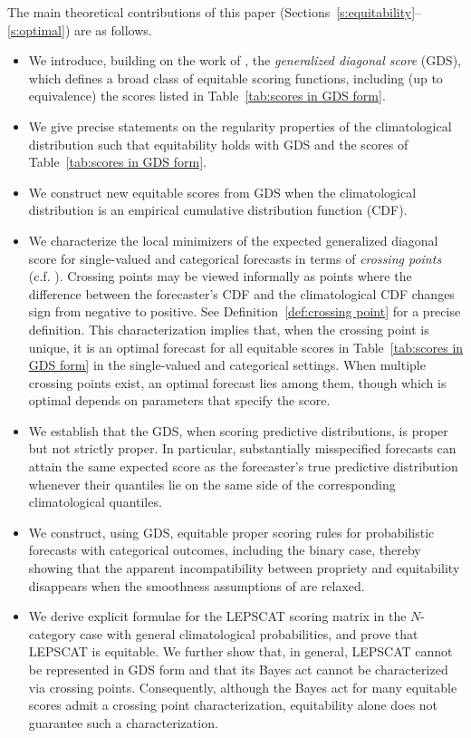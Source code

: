 \documentclass[10pt]{article} %
\theoremstyle{theorem}
\theoremstyle{definition}
\begin{document}
The main theoretical contributions of this paper (Sections~\ref{s:equitability}–\ref{s:optimal}) are as follows.
\begin{itemize}
\item We introduce, building on the work of \citet{ben2018diagonal}, the \emph{generalized diagonal score} (GDS), which defines a broad class of equitable scoring functions, including (up to equivalence) the scores listed in Table~\ref{tab:scores in GDS form}.
\item We give precise statements on the regularity properties of the climatological distribution such that equitability holds with GDS and the scores of Table~\ref{tab:scores in GDS form}.
\item We construct new equitable scores from GDS when the climatological distribution is an empirical cumulative distribution function (CDF).
\item We characterize the local minimizers of the expected generalized diagonal score for single-valued and categorical forecasts in terms of \emph{crossing points} (c.f. \citealt{ben2021verification}). Crossing points may be viewed informally as points where the difference between the forecaster's CDF and the climatological CDF changes sign from negative to positive. See Definition~\ref{def:crossing point} for a precise definition. This characterization implies that, when the crossing point is unique, it is an optimal forecast for all equitable scores in Table~\ref{tab:scores in GDS form} in the single-valued and categorical settings. When multiple crossing points exist, an optimal forecast lies among them, though which is optimal depends on parameters that specify the score.
\item We establish that the GDS, when scoring predictive distributions, is proper but not strictly proper. In particular, substantially misspecified forecasts can attain the same expected score as the forecaster's true predictive distribution whenever their quantiles lie on the same side of the corresponding climatological quantiles.
\item We construct, using GDS, equitable proper scoring rules for probabilistic forecasts with categorical outcomes, including the binary case, thereby showing that the apparent incompatibility between propriety and equitability disappears when the smoothness assumptions of \citet{jolliffe2008proper} are relaxed.
\item We derive explicit formulae for the LEPSCAT scoring matrix \citep{potts1996revised} in the $N$-category case with general climatological probabilities, and prove that LEPSCAT is equitable. We further show that, in general, LEPSCAT cannot be represented in GDS form and that its Bayes act cannot be characterized via crossing points. Consequently, although the Bayes act for many equitable scores admit a crossing point characterization, equitability alone does not guarantee such a characterization.
\end{itemize}
\end{document}
